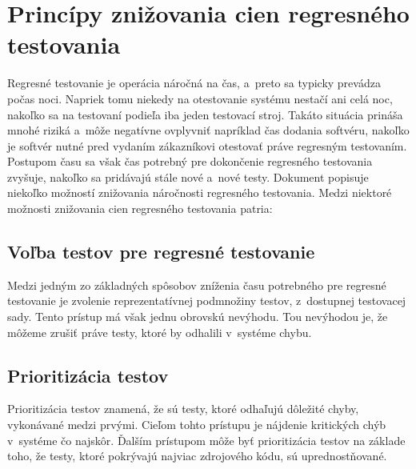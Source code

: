 \section{Princípy znižovania cien regresného testovania}
\label{sekcia:principy_znizovania_cien}
Regresné testovanie je operácia náročná na čas, a~preto sa typicky 
prevádza počas noci. Napriek tomu niekedy na otestovanie systému 
nestačí ani celá noc, nakoľko sa na testovaní podieľa iba jeden testovací 
stroj. Takáto situácia prináša mnohé riziká a~môže negatívne ovplyvniť 
napríklad čas dodania softvéru, nakoľko je softvér nutné pred vydaním 
zákazníkovi otestovať práve regresným testovaním. Postupom času sa však 
čas potrebný pre dokončenie regresného testovania zvyšuje, nakoľko sa 
pridávajú stále nové a~nové testy. Dokument \cite{Parallel_approach} 
popisuje niekoľko možností znižovania náročnosti regresného testovania.
Medzi niektoré možnosti znižovania cien regresného testovania patria:

\subsection*{Voľba testov pre regresné testovanie}
Medzi jedným zo základných spôsobov zníženia času potrebného pre 
regresné testovanie je zvolenie reprezentatívnej podmnožiny testov,
z~dostupnej testovacej sady. Tento prístup má však jednu obrovskú nevýhodu. 
Tou nevýhodou je, že môžeme zrušiť práve testy, ktoré by odhalili 
v~systéme chybu. 

\subsection*{Prioritizácia testov}
Prioritizácia testov znamená, že sú testy, ktoré odhaľujú dôležité chyby, 
vykonávané medzi prvými. Cieľom tohto prístupu je nájdenie kritických 
chýb v~systéme čo najskôr. Ďalším prístupom môže byť prioritizácia testov 
na základe toho, že testy, ktoré pokrývajú najviac zdrojového kódu,
sú uprednostňované.

